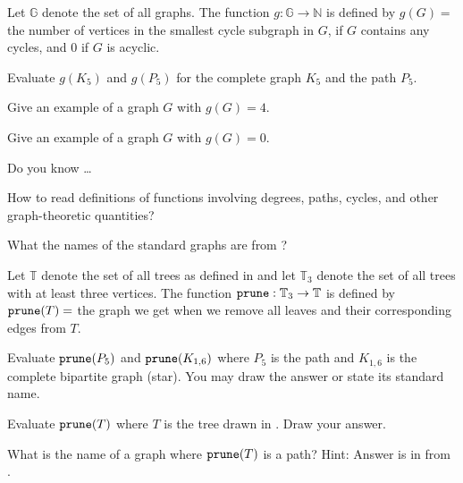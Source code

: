  \begin{exer}[\exerU] %
\label{exer_girth_fn}
    Let $\mathbb{G}$ denote the set of all graphs. The function $g: \mathbb{G} \to \mathbb{N}$ is defined by $g(G) =$ the number of vertices in the smallest cycle subgraph in $G$, if $G$ contains any cycles, and 0 if $G$ is acyclic.
        \begin{exerpart}
            \item Evaluate $g(K_5)$ and $g(P_5)$ for the complete graph $K_5$ and the path $P_5$.
            \item Give an example of a graph $G$ with $g(G) = 4$.
            \item Give an example of a graph $G$ with $g(G) = 0$.
        \end{exerpart}
\end{exer}

\begin{exer}[\exerR] %
\label{exer_dyk_graph_functions}
    Do you know \ldots
        \begin{exerpart}
            \item How to read definitions of functions involving degrees, paths, cycles, and other graph-theoretic quantities?
            \item What the names of the standard graphs are from ?
        \end{exerpart}
\end{exer}

 \begin{exer}[\exerE] %
 \label{exer_pruning_tree_function}
     Let $\mathbb{T}$ denote the set of all trees as defined in  and let $\mathbb{T}_3$ denote the set of all trees with at least three vertices.  The function $\texttt{prune}: \mathbb{T}_3 \to \mathbb{T}$ is defined by $\texttt{prune}(T)=$ the graph we get when we remove all leaves and their corresponding edges from $T$.
         \begin{exerpart}
             \item Evaluate $\texttt{prune}(P_5)$ and $\texttt{prune}(K_{1,6})$ where $P_5$ is the path and $K_{1,6}$ is the complete bipartite graph (star). You may draw the answer or state its standard name.
             \item Evaluate $\texttt{prune}(T)$ where $T$ is the tree drawn in . Draw your answer.
             \item What is the name of a graph where $\texttt{prune}(T)$ is a path?  Hint: Answer is in  from .
         \end{exerpart}
 \end{exer}

